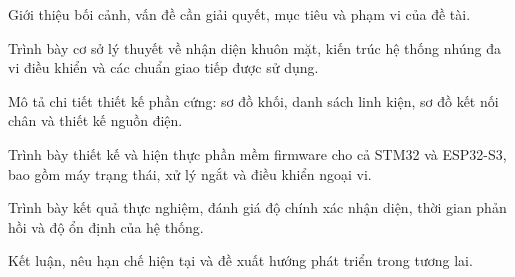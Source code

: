 \begin{description}[leftmargin=3.5cm, style=nextline]
  \item[\textbf{Chương \ref{chap:intro}}] Giới thiệu bối cảnh, vấn đề cần giải quyết, mục tiêu và phạm vi của đề tài.
  \item[\textbf{Chương \ref{chap:theory}}] Trình bày cơ sở lý thuyết về nhận diện khuôn mặt, kiến trúc hệ thống nhúng đa vi điều khiển và các chuẩn giao tiếp được sử dụng.
  \item[\textbf{Chương \ref{chap:hardware}}] Mô tả chi tiết thiết kế phần cứng: sơ đồ khối, danh sách linh kiện, sơ đồ kết nối chân và thiết kế nguồn điện.
  \item[\textbf{Chương \ref{chap:software}}] Trình bày thiết kế và hiện thực phần mềm firmware cho cả STM32 và ESP32-S3, bao gồm máy trạng thái, xử lý ngắt và điều khiển ngoại vi.
  \item[\textbf{Chương \ref{chap:results}}] Trình bày kết quả thực nghiệm, đánh giá độ chính xác nhận diện, thời gian phản hồi và độ ổn định của hệ thống.
  \item[\textbf{Chương \ref{chap:conclusion}}] Kết luận, nêu hạn chế hiện tại và đề xuất hướng phát triển trong tương lai.
\end{description}

